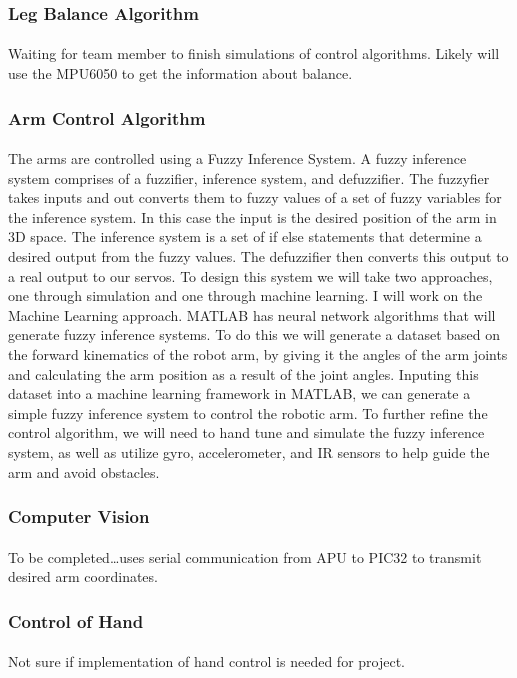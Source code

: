\documentclass[letterpaper]{article}
\begin{document}
\subsubsection{Leg Balance Algorithm}
\paragraph{} Waiting for team member to finish simulations of control
algorithms. Likely will use the MPU6050 to get the information about balance.

\subsubsection{Arm Control Algorithm}
\paragraph{} The arms are controlled using a Fuzzy Inference System. A fuzzy
inference system comprises of a fuzzifier, inference system, and defuzzifier.
The fuzzyfier takes inputs and out converts them to fuzzy values of a set of
fuzzy variables for the inference system. In this case the input is the desired
position of the arm in 3D space. The inference system is a set of if else
statements that determine a desired output from the fuzzy values. The
defuzzifier then converts this output to a real output to our
servos\cite{fuzzy2011}. To design this system we will take two approaches, one
through simulation and one through machine learning. I will work on the Machine
Learning approach. MATLAB has neural network algorithms that will generate fuzzy
inference systems. To do this we will generate a dataset based on the forward
kinematics of the robot arm, by giving it the angles of the arm joints and
calculating the arm position as a result of the joint angles. Inputing this
dataset into a machine learning framework in MATLAB, we can generate a simple
fuzzy inference system to control the robotic arm\cite{fuzzymatlab}. To further
refine the control algorithm, we will need to hand tune and simulate the fuzzy
inference system, as well as utilize gyro, accelerometer, and IR sensors to help
guide the arm and avoid obstacles.

\subsubsection{Computer Vision}
\paragraph{} To be completed\dots uses serial communication from APU to PIC32 to
transmit desired arm coordinates.

\subsubsection{Control of Hand}
\paragraph{} Not sure if implementation of hand control is needed for project.

\printbibliography
\end{document}
